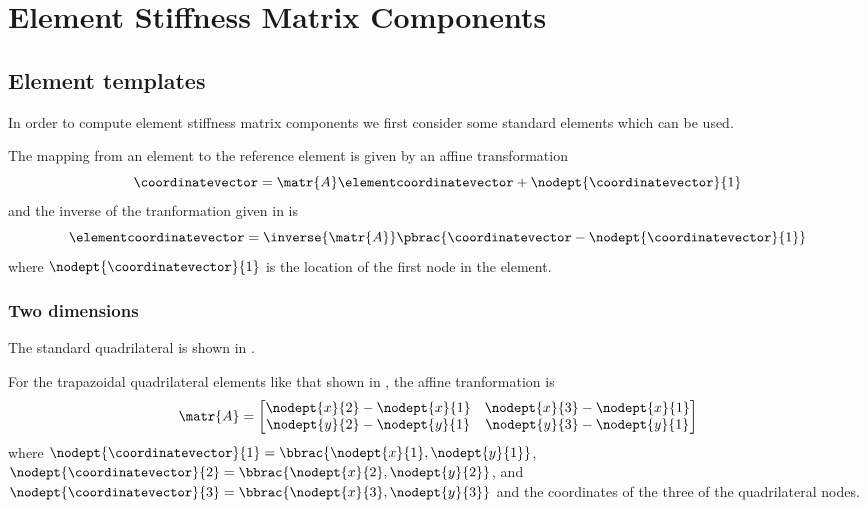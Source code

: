 \chapter{Element Stiffness Matrix Components}
\label{app:ElementStiffnessMatrixComponents}

\section{Element templates}
\label{sec:ElementStiffnessMatrixElementTemplates}

In order to compute element stiffness matrix components we first consider some standard elements which can be used.

The mapping from an element to the reference element is given by an affine transformation \ie
\begin{equation}
  \coordinatevector=\matr{A}\elementcoordinatevector+\nodept{\coordinatevector}{1}
  \label{eqn:ElementStiffnessMatrixAffineTransformation}
\end{equation}
and the inverse of the tranformation given in  is
\begin{equation}
  \elementcoordinatevector=\inverse{\matr{A}}\pbrac{\coordinatevector-\nodept{\coordinatevector}{1}}
  \label{eqn:ElementStiffnessMatrixInverseAffineTransformation}
\end{equation}
where $\nodept{\coordinatevector}{1}$ is the location of the first node in the element.

\subsection{Two dimensions}
\label{subsec:ElementStiffnessMatrixElementTemplates2D}

The standard quadrilateral is shown in .


For the trapazoidal quadrilateral elements like that shown in , the affine tranformation is 
\begin{equation}
  \matr{A} =\begin{bmatrix}
  \nodept{x}{2}-\nodept{x}{1} & \nodept{x}{3}-\nodept{x}{1} \\
  \nodept{y}{2}-\nodept{y}{1} & \nodept{y}{3}-\nodept{y}{1}
  \end{bmatrix}
  \label{eqn:QuadrilateralAffineTransformation}
\end{equation}
where
$\nodept{\coordinatevector}{1}=\bbrac{\nodept{x}{1},\nodept{y}{1}}$,
$\nodept{\coordinatevector}{2}=\bbrac{\nodept{x}{2},\nodept{y}{2}}$,
and
$\nodept{\coordinatevector}{3}=\bbrac{\nodept{x}{3},\nodept{y}{3}}$
and the coordinates of the three of the quadrilateral nodes.


